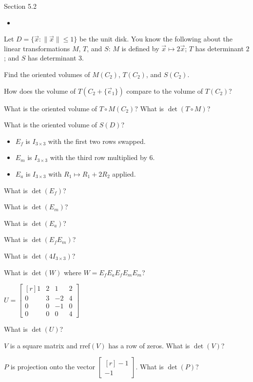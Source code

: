 \documentclass{problemset}
\newcommand{\mat}[1]{\begin{bmatrix*}[r]#1\end{bmatrix*}}
\begin{document}
\begin{lesson}
	\newpage

	Section 5.2

	\begin{itemize}
		\item 
	\end{itemize}


	\newpage
\end{lesson}
	\question
	Let $D=\{\vec x:\|\vec x\|\leq 1\}$ be the unit disk. You know the following about the 
	linear transformations $M$, $T$, and $S$: $M$ is
	defined by $\vec x\mapsto 2\vec x$; $T$ has determinant $2$; and $S$ has determinant $3$.
	\begin{parts}
		\item Find the oriented volumes of $M(C_2)$, $T(C_2)$, and $S(C_2)$.
		\item How does the volume of $T(C_2+\{\vec e_1\})$ compare to the volume 
			of $T(C_2)$?
		\item What is the oriented volume of $T\circ M(C_2)$? What is $\det(T\circ M)$?
		\item What is the oriented volume of $S(D)$?
	\end{parts}

	\question
	\begin{itemize}
		\item $E_f$ is $I_{3\times 3}$ with the first two rows swapped.
		\item $E_m$ is $I_{3\times 3}$ with the third row multiplied by 6.
		\item $E_a$ is $I_{3\times 3}$ with $R_1\mapsto R_1+2R_2$ applied.
	\end{itemize}

	\begin{parts}
		\item What is $\det(E_f)$?
		\item What is $\det(E_m)$?
		\item What is $\det(E_a)$?
		\item What is $\det(E_fE_m)$?
		\item What is $\det(4I_{3\times 3})$?
		\item What is $\det(W)$ where $W=E_fE_aE_fE_mE_m$?
	\end{parts}

	\question
	$U=\mat{1&2&1&2\\0&3&-2&4\\0&0&-1&0\\0&0&0&4}$
	\begin{parts}
		\item What is $\det(U)$?
		\item $V$ is a square matrix and rref$(V)$ has a row of zeros.
		 What is $\det(V)$?
		\item $P$ is projection onto the vector $\mat{-1\\-1}$. What is $\det(P)$?
	\end{parts}
\end{document}
